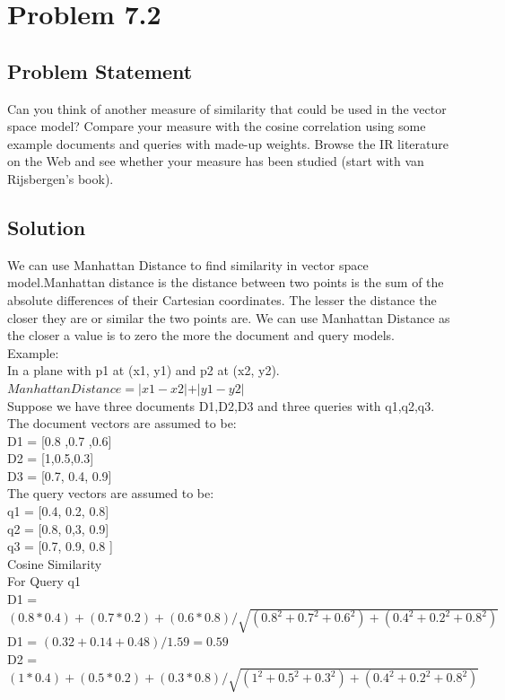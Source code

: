 \documentclass[12pt]{report}
\begin{document}
\chapter{Problem 7.2}
\section{Problem Statement}
Can you think of another measure of similarity that could be used in the vector space model? Compare your measure with the cosine correlation using some example documents and queries with made-up weights. Browse the IR literature on the Web and see whether your measure has been studied (start with van Rijsbergen’s book).   
\section{Solution}
We can use Manhattan Distance to find similarity in vector space model.Manhattan distance is the distance between two points is the sum of the absolute differences of their Cartesian coordinates. The lesser the distance the closer they are or similar the two points are. We can use Manhattan Distance as the closer a value is to zero the more the document and query models.\\
Example:\\
In a plane with p1 at (x1, y1) and p2 at (x2, y2).\\
$ Manhattan Distance =  \lvert x1 - x2  \lvert  +  \lvert y1 - y2  \lvert $  \\
Suppose we have three documents D1,D2,D3 and three queries with q1,q2,q3.\\
The document vectors are assumed to be:\\
D1 = [0.8 ,0.7 ,0.6]\\
D2 = [1,0.5,0.3]\\
D3 = [0.7, 0.4, 0.9]\\
The query vectors are assumed to be:\\
q1 = [0.4, 0.2, 0.8]\\
q2 = [0.8, 0,3, 0.9]\\
q3 = [0.7, 0.9, 0.8 ]\\
Cosine Similarity\\
For Query q1 \\
D1 = $(0.8*0.4 )+ (0.7*0.2) + (0.6*0.8)/ \sqrt{(0.8^2 + 0.7^2 + 0.6^2) + (0.4^2 + 0.2^2 + 0.8^2)}$\\
D1 = $ (0.32 + 0.14 + 0.48)/1.59  = 0.59$\\
D2 = $(1*0.4 )+ (0.5*0.2) + (0.3*0.8)/ \sqrt{(1^2 + 0.5^2 + 0.3^2) + (0.4^2 + 0.2^2 + 0.8^2)}$\\
\end{document}
